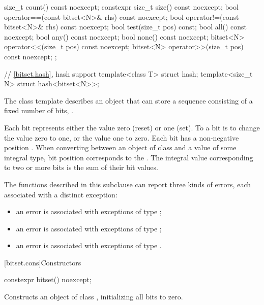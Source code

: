 \begin{codeblock}
{{    size_t count() const noexcept;
    constexpr size_t size() const noexcept;
    bool operator==(const bitset<N>& rhs) const noexcept;
    bool operator!=(const bitset<N>& rhs) const noexcept;
    bool test(size_t pos) const;
    bool all() const noexcept;
    bool any() const noexcept;
    bool none() const noexcept;
    bitset<N> operator<<(size_t pos) const noexcept;
    bitset<N> operator>>(size_t pos) const noexcept;
  };

  // \ref{bitset.hash}, hash support
  template<class T> struct hash;
  template<size_t N> struct hash<bitset<N>>;
}
\end{codeblock}

\pnum
The class template
describes an object that can store a sequence consisting of a fixed number of
bits, .

\pnum
Each bit represents either the value zero (reset) or one (set).
To
a bit is to change the value zero to one, or the value one to
zero.
Each bit has a non-negative position .
When converting
between an object of class
and a value of some
integral type, bit position  corresponds to the
.
The integral value corresponding to two
or more bits is the sum of their bit values.

\pnum
The functions described in this subclause can report three kinds of
errors, each associated with a distinct exception:

\begin{itemize}
\item
an
error is associated with exceptions of type
;
%
\item
an
error is associated with exceptions of type
;
%
\item
an
error is associated with exceptions of type
.
%
\end{itemize}

[bitset.cons]{Constructors}

%
\begin{itemdecl}
constexpr bitset() noexcept;
\end{itemdecl}

\begin{itemdescr}
\pnum
\effects
Constructs an object of class
,
initializing all bits to zero.
\end{itemdescr}

